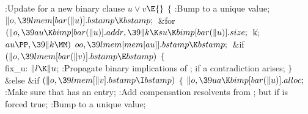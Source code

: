 \Y\B\4:Update for a new binary clause $u\lor v$\X${}\E{}$\6
${}\{{}$\1\6
:Bump  to a unique value\X;\6
${}\|o,\39\\{lmem}[\\{bar}(\|u)].\\{bstamp}\K\\{bstamp};{}$\6
\&{for} ${}(\|o,\39\\{au}\K\\{bimp}[\\{bar}(\|u)].\\{addr},\39\|k\K\\{su}\K%
\\{bimp}[\\{bar}(\|u)].\\{size};{}$ \|k; ${}\\{au}\PP,\39\|k\MM){}$\1\5
${}\\{oo},\39\\{lmem}[\\{mem}[\\{au}]].\\{bstamp}\K\\{bstamp};{}$\2\6
\&{if} ${}(\|o,\39\\{lmem}[\\{bar}(\|v)].\\{bstamp}\E\\{bstamp}){}$\5
${}\{{}$\1\6
\4\\{fix\_u}:\5
${}\|l\K\|u{}$;\5
:Propagate binary implications of ;  if a
contradiction arises\X;\6
\4${}\}{}$\5
\2\&{else} \&{if} ${}(\|o,\39\\{lmem}[\|v].\\{bstamp}\I\\{bstamp}){}$\5
${}\{{}$\1\6
${}\|o,\39\\{ua}\K\\{bimp}[\\{bar}(\|u)].\\{alloc};{}$\6
:Make sure that  has an  entry\X;\6
:Add compensation resolvents from ; but  if  is forced true\X;\6
:Bump  to a unique value\X;\6
